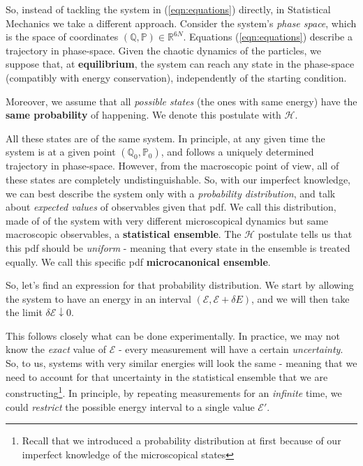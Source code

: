 \documentclass[../template.tex]{subfiles}
\begin{document}
\medskip

So, instead of tackling the system in (\ref{eqn:equations}) directly, in Statistical Mechanics we take a different approach. Consider the system's \textit{phase space}, which is the space of coordinates $(\mathbb{Q},\mathbb{P}) \in \mathbb{R}^{6N}$. Equations (\ref{eqn:equations}) describe a trajectory in phase-space. Given the chaotic dynamics of the particles, we suppose that, at \textbf{equilibrium}, the system can reach any state in the phase-space (compatibly with energy conservation), independently of the starting condition.

Moreover, we assume that all \textit{possible states} (the ones with same energy) have the \textbf{same probability} of happening. We denote this postulate with $\mathcal{H}$. 

\medskip

All these states are  of the same system. In principle, at any given time the system is at a given point $(\mathbb{Q}_0, \mathbb{P}_0)$, and follows a uniquely determined trajectory in phase-space. However, from the macroscopic point of view, all of these states are completely undistinguishable. So, with our imperfect knowledge, we can best describe the system only with a \textit{probability distribution}, and talk about \textit{expected values} of observables given that pdf. We call this distribution, made of  of the system with very different microscopical dynamics but same macroscopic observables, a \textbf{statistical ensemble}. The $\mathcal{H}$ postulate tells us that this pdf should be \textit{uniform} - meaning that every state in the ensemble is treated equally. We call this specific pdf \textbf{microcanonical ensemble}.   

\medskip

So, let's find an expression for that probability distribution. We start by allowing the system to have an energy in an interval $(\mathcal{E}, \mathcal{E}+\delta E)$, and we will then take the limit $\delta \mathcal{E} \downarrow 0$. 

\medskip

This follows closely what can be done experimentally. In practice, we may not know the \textit{exact} value of $\mathcal{E}$ - every measurement will have a certain \textit{uncertainty}. So, to us, systems with very similar energies will look the same - meaning that we need to account for that uncertainty in the statistical ensemble that we are constructing\footnote{Recall that we introduced a probability distribution at first because of our imperfect knowledge of the microscopical states}. In principle, by repeating measurements for an \textit{infinite} time, we could \textit{restrict} the possible energy interval to a single value $\mathcal{E}'$.
\end{document}
